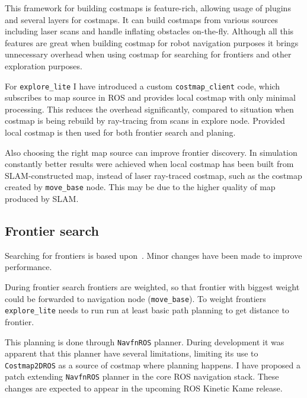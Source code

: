 This framework for building costmaps is feature-rich, allowing usage of plugins and several layers for costmaps. It can build costmaps from various sources including laser scans and handle inflating obstacles on-the-fly. Although all this features are great when building costmap for robot navigation purposes it brings unnecessary overhead when using costmap for searching for frontiers and other exploration purposes.

For \texttt{explore\_lite} I have introduced a custom \texttt{costmap\_client} code, which subscribes to map source in \gls{ROS} and provides local costmap with only minimal processing. This reduces the overhead significantly, compared to situation when costmap is being rebuild by ray-tracing from scans in explore node. Provided local costmap is then used for both frontier search and planing.

Also choosing the right map source can improve frontier discovery. In simulation constantly better results were achieved when local costmap has been built from \gls{SLAM}-constructed map, instead of laser ray-traced costmap, such as the costmap created by \texttt{move\_base} node. This may be due to the higher quality of map produced by \gls{SLAM}.

\subsection{Frontier search}

Searching for frontiers is based upon~\cite{DuHadway2010}. Minor changes have been made to improve performance.

During frontier search frontiers are weighted, so that frontier with biggest weight could be forwarded to navigation node (\texttt{move\_base}). To weight frontiers \texttt{explore\_lite} needs to run run at least basic path planning to get distance to frontier.

This planning is done through \texttt{NavfnROS} planner. During development it was apparent that this planner have several limitations, limiting its use to \texttt{Cost\-map\-2D\-ROS} as a source of costmap where planning happens. I have proposed a patch extending \texttt{NavfnROS} planner in the core \gls{ROS} navigation stack. These changes are expected to appear in the upcoming \gls{ROS} Kinetic Kame release.


